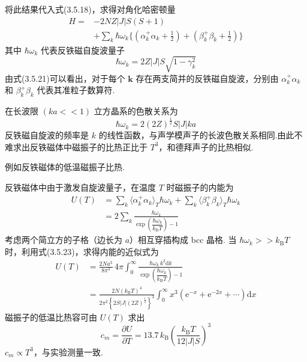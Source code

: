 将此结果代入式(3.5.18)，求得对角化哈密顿量
\begin{equation}
\begin{aligned}
  H={}&-2NZ\left|J\right|S\left(S+1\right)\\
  &+\sum_k\hbar\omega_k\biggl\{\left(\alpha_k^{+}\alpha_k+\frac{1}{2}\right)
  +\left(\beta_k^{+}\beta_k+\frac{1}{2}\right)\biggr\}
\end{aligned}
\end{equation}
其中 $\hbar\omega_k$ 代表反铁磁自旋波量子
\begin{equation}
  \hbar\omega_k=2Z\left|J\right|S\sqrt{1-\gamma_k^2}
\end{equation}
由式(3.5.21)可以看出，对于每个 $\boldsymbol{k}$
存在两支简并的反铁磁自旋波，分别由 $\alpha_k^{+}\alpha_k$ 和
$\beta_k^{+}\beta_k$ 代表其准粒子数算符.

在长波限 $\left(ka<\!<1\right)$ 立方晶系的色散关系为
\begin{equation}
  \hbar\omega_k=2\left(2Z\right)^{\frac{1}{2}}S\left|J\right|ka
\end{equation}
反铁磁自旋波的频率是 $k$
的线性函数，与声学模声子的长波色散关系相同.由此不难求出反铁磁体中磁振子的比热正比于
$T^3$，和德拜声子的比热相似.

例如反铁磁体的低温磁振子比热.

反铁磁体中由于激发自旋波量子，在温度 $T$ 时磁振子的内能为
\begin{equation}
\begin{aligned}
  U\left(T\right)&=\sum_k\langle\alpha_k^{+}\alpha_k\rangle_T\hbar\omega_k
  +\sum_k\langle\beta_k^{+}\beta_k\rangle_T\hbar\omega_k\\
  &=2\sum_k\frac{\hbar\omega_k}{\exp\left(\dfrac{\hbar\omega_k}{k_{\mathrm{B}}T}\right)-1}
\end{aligned}
\end{equation}
考虑两个简立方的子格（边长为 $a$）相互穿插构成 bcc 晶格.
当 $\hbar\omega_k>\!>k_{\mathrm{B}}T$ 时，利用式(3.5.23)，求得内能的近似式为
\begin{equation}
\begin{aligned}
  U\left(T\right)&=\frac{2Na^3}{8\pi^3}\,4\pi\int_0^{\infty}
  \frac{\hbar\omega_k\,k^2\mathrm{d}k}{\exp\left(\dfrac{\hbar\omega_k}{k_{\mathrm{B}}T}\right)-1}\\
  &=\frac{2N\left(k_{\mathrm{B}}T\right)^4}{2\pi^2\left\{2S\left|J\right|\left(2Z\right)^{\frac{1}{2}}\right\}^3}
  \int_0^{\infty}x^3\left(\mathrm{e}^{-x}+\mathrm{e}^{-2x}+\cdots\right)\mathrm{d}x
\end{aligned}
\end{equation}
磁振子的低温比热容可由 $U\left(T\right)$ 求出
\begin{equation}
  c_m=\frac{\partial U}{\partial T}=13.7\,k_{\mathrm{B}}\left(\frac{k_{\mathrm{B}}T}{12\left|J\right|S}\right)^3
\end{equation}
$c_m\propto T^3$，与实验测量一致.

